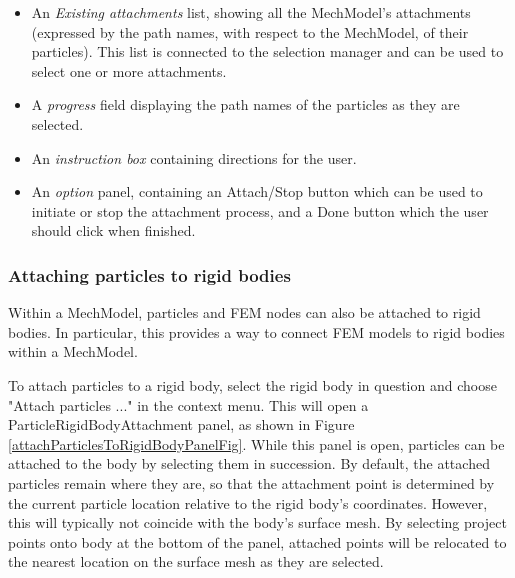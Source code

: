 \documentclass{article}
\begin{document}
\begin{itemize}

\item An {\it Existing attachments} list, showing all the MechModel's
attachments (expressed by the path names, with respect to the
MechModel, of their particles). This list is connected to the
selection manager and can be used to select one or more attachments.

\item A {\it progress} field displaying the path names of the particles as
they are selected.

\item An {\it instruction box} containing directions for the user.

\item An {\it option} panel, containing an {\sf Attach/Stop} 
button which can be used
to initiate or stop the attachment process, and a {\sf Done} button which
the user should click when finished.

\end{itemize}

\subsubsection{Attaching particles to rigid bodies}
\label{particleRigidBodyAttachSec}

Within a MechModel, particles and FEM nodes can also
be attached to rigid bodies. In particular, this provides a way
to connect FEM models to rigid bodies within a MechModel.

To attach particles to a rigid body, select the rigid body in question
and choose {\sf "Attach particles ..."} in the context menu. This will
open a ParticleRigidBodyAttachment panel, as shown in
Figure \ref{attachParticlesToRigidBodyPanelFig}. While this panel is open,
particles can be attached to the body by selecting them in succession.
By default, the attached particles remain where they are, so that the
attachment point is determined by the current particle location
relative to the rigid body's coordinates. However, this will typically
not coincide with the body's surface mesh.  By selecting {\sf project
points onto body} at the bottom of the panel, attached points will be
relocated to the nearest location on the surface mesh as they are
selected.
\end{document}
